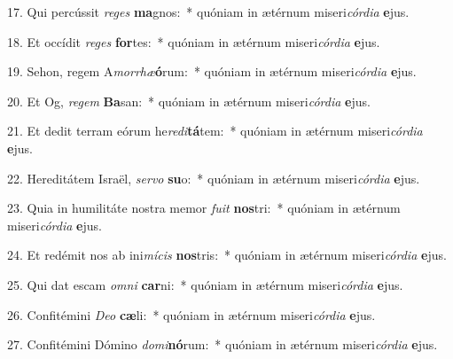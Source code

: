 17. Qui percússit \textit{re}\textit{ges} \textbf{ma}gnos:~*  quóniam in ætérnum miseri\textit{cór}\textit{di}\textit{a} \textbf{e}jus.\

18. Et occídit \textit{re}\textit{ges} \textbf{for}tes:~*  quóniam in ætérnum miseri\textit{cór}\textit{di}\textit{a} \textbf{e}jus.\

19. Sehon, regem A\textit{mor}\textit{rhæ}\textbf{ó}rum:~*  quóniam in ætérnum miseri\textit{cór}\textit{di}\textit{a} \textbf{e}jus.\

20. Et Og, \textit{re}\textit{gem} \textbf{Ba}san:~*  quóniam in ætérnum miseri\textit{cór}\textit{di}\textit{a} \textbf{e}jus.\

21. Et dedit terram eórum he\textit{re}\textit{di}\textbf{tá}tem:~*  quóniam in ætérnum miseri\textit{cór}\textit{di}\textit{a} \textbf{e}jus.\

22. Hereditátem Israël, \textit{ser}\textit{vo} \textbf{su}o:~*  quóniam in ætérnum miseri\textit{cór}\textit{di}\textit{a} \textbf{e}jus.\

23. Quia in humilitáte nostra memor \textit{fu}\textit{it} \textbf{nos}tri:~*  quóniam in ætérnum miseri\textit{cór}\textit{di}\textit{a} \textbf{e}jus.\

24. Et redémit nos ab ini\textit{mí}\textit{cis} \textbf{nos}tris:~*  quóniam in ætérnum miseri\textit{cór}\textit{di}\textit{a} \textbf{e}jus.\

25. Qui dat escam \textit{om}\textit{ni} \textbf{car}ni:~*  quóniam in ætérnum miseri\textit{cór}\textit{di}\textit{a} \textbf{e}jus.\

26. Confitémini \textit{De}\textit{o} \textbf{cæ}li:~*  quóniam in ætérnum miseri\textit{cór}\textit{di}\textit{a} \textbf{e}jus.\

27. Confitémini Dómino \textit{do}\textit{mi}\textbf{nó}rum:~*  quóniam in ætérnum miseri\textit{cór}\textit{di}\textit{a} \textbf{e}jus.\

